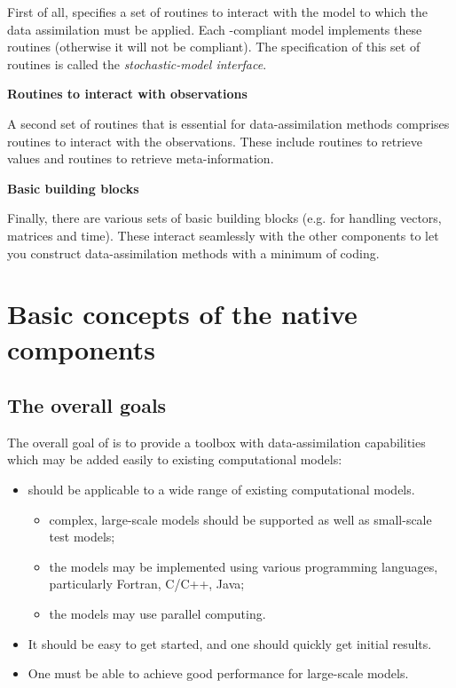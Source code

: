 First of all, \oda specifies a set of routines to interact with the model to which the data assimilation must be applied. Each \oda-compliant model implements these routines (otherwise it will not be \oda compliant). The specification of this set of routines is called the \emph{stochastic-model interface}.

\textbf{Routines to interact with observations}

A second set of routines that is essential for data-assimilation methods comprises routines to interact with the observations. These include routines to retrieve values and routines to retrieve meta-information.

\textbf{Basic building blocks}

Finally, there are various sets of basic building blocks (e.g. for handling vectors, matrices and time). These interact seamlessly with the other \oda components to let you construct data-assimilation methods with a minimum of coding.

\section{Basic concepts of the \oda native components}\label{sec:components}

\subsection{The overall goals}

The overall goal of \oda is to provide a toolbox with data-assimilation capabilities which may be added easily to existing computational models:

\begin{itemize}
\item \oda should be applicable to a wide range of existing computational models.
\begin{itemize}
\item complex, large-scale models should be supported as well as small-scale test models;
\item the models may be implemented using various programming languages, particularly Fortran, C/C++, Java;
\item the models may use parallel computing.
\end{itemize}
\item It should be easy to get started, and one should quickly get initial results.
\item One must be able to achieve good performance for large-scale models.
\end{itemize}

